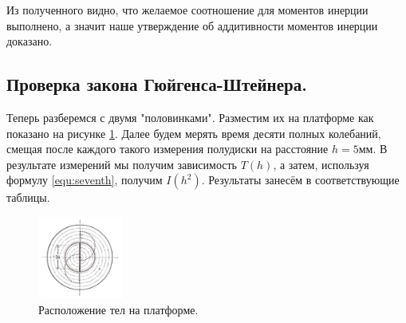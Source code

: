 \documentclass[12pt,a4paper]{article}
\begin{document}
\par Из полученного видно, что желаемое соотношение для моментов инерции выполнено, а значит наше утверждение об аддитивности моментов инерции доказано.

\subsection{Проверка закона Гюйгенса-Штейнера.}
Теперь разберемся с двумя "половинками". Разместим их на платформе как показано на рисунке \ref{ris:position}. Далее будем мерять время десяти полных колебаний, смещая после каждого такого измерения полудиски на расстояние $h=5$мм. В результате измерений мы получим зависимость $T(h)$, а затем, используя формулу \ref{equ:seventh}, получим $I(h^2)$. Результаты занесём в соответствующие таблицы.
	    \begin{figure}
			\vspace{-3em}
			\includegraphics[width=0.25\textwidth]{position.jpg}
			\caption{Расположение тел на платформе.}
			\label{ris:position}
		\end{figure}	
\end{document}
